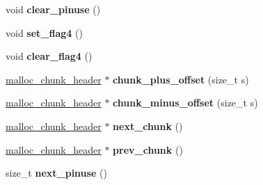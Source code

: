 \begin{DoxyCompactItemize}
\item 
void {\bfseries clear\+\_\+pinuse} ()\hypertarget{structspp_1_1malloc__chunk__header_a33a5e631738329520eacf9f07a531620}{}\label{structspp_1_1malloc__chunk__header_a33a5e631738329520eacf9f07a531620}

\item 
void {\bfseries set\+\_\+flag4} ()\hypertarget{structspp_1_1malloc__chunk__header_a4470d00a996ea468af0e957a39551fd2}{}\label{structspp_1_1malloc__chunk__header_a4470d00a996ea468af0e957a39551fd2}

\item 
void {\bfseries clear\+\_\+flag4} ()\hypertarget{structspp_1_1malloc__chunk__header_a3d5c780439c6b16bf32dac997ec6d049}{}\label{structspp_1_1malloc__chunk__header_a3d5c780439c6b16bf32dac997ec6d049}

\item 
\hyperlink{structspp_1_1malloc__chunk__header}{malloc\+\_\+chunk\+\_\+header} $\ast$ {\bfseries chunk\+\_\+plus\+\_\+offset} (size\+\_\+t s)\hypertarget{structspp_1_1malloc__chunk__header_a98823660a56ed72d24b32ac957e1de4f}{}\label{structspp_1_1malloc__chunk__header_a98823660a56ed72d24b32ac957e1de4f}

\item 
\hyperlink{structspp_1_1malloc__chunk__header}{malloc\+\_\+chunk\+\_\+header} $\ast$ {\bfseries chunk\+\_\+minus\+\_\+offset} (size\+\_\+t s)\hypertarget{structspp_1_1malloc__chunk__header_a4e596b9452fa5c01b92d87ef21d8f247}{}\label{structspp_1_1malloc__chunk__header_a4e596b9452fa5c01b92d87ef21d8f247}

\item 
\hyperlink{structspp_1_1malloc__chunk__header}{malloc\+\_\+chunk\+\_\+header} $\ast$ {\bfseries next\+\_\+chunk} ()\hypertarget{structspp_1_1malloc__chunk__header_a475db5b22123ccd80ae3cfd453f81366}{}\label{structspp_1_1malloc__chunk__header_a475db5b22123ccd80ae3cfd453f81366}

\item 
\hyperlink{structspp_1_1malloc__chunk__header}{malloc\+\_\+chunk\+\_\+header} $\ast$ {\bfseries prev\+\_\+chunk} ()\hypertarget{structspp_1_1malloc__chunk__header_acac4332425de51f5ea922f0e616032ee}{}\label{structspp_1_1malloc__chunk__header_acac4332425de51f5ea922f0e616032ee}

\item 
size\+\_\+t {\bfseries next\+\_\+pinuse} ()\hypertarget{structspp_1_1malloc__chunk__header_a75a8c35fc6422903aa5a463f9112f3e2}{}\label{structspp_1_1malloc__chunk__header_a75a8c35fc6422903aa5a463f9112f3e2}

\end{DoxyCompactItemize}
